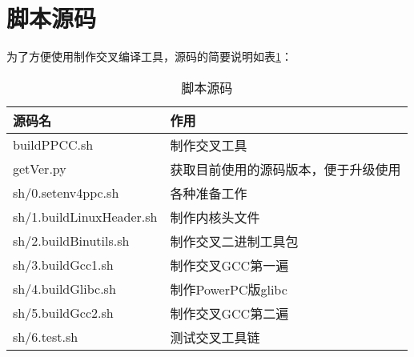 \documentclass[12pt,a4paper]{article}
\begin{document}
\section{脚本源码} 
为了方便使用制作交叉编译工具，源码的简要说明如表\ref{脚本源码}：
\begin{table}[!hbp]
\begin{center}
    \begin{tabular}{|l|l|}
        \hline
        源码名 & 作用\\
        \hline
        buildPPCC.sh & 制作交叉工具 \\
        \hline
        getVer.py & 获取目前使用的源码版本，便于升级使用 \\
        \hline
        sh/0.setenv4ppc.sh & 各种准备工作 \\
        \hline
        sh/1.buildLinuxHeader.sh & 制作内核头文件 \\
        \hline
        sh/2.buildBinutils.sh & 制作交叉二进制工具包 \\
        \hline
        sh/3.buildGcc1.sh & 制作交叉GCC第一遍 \\
        \hline
        sh/4.buildGlibc.sh & 制作PowerPC版glibc \\
        \hline
        sh/5.buildGcc2.sh & 制作交叉GCC第二遍 \\
        \hline
        sh/6.test.sh & 测试交叉工具链 \\
        \hline
    \end{tabular}
    \caption{脚本源码\label{脚本源码}}
\end{center}
\end{table}
\end{document}
